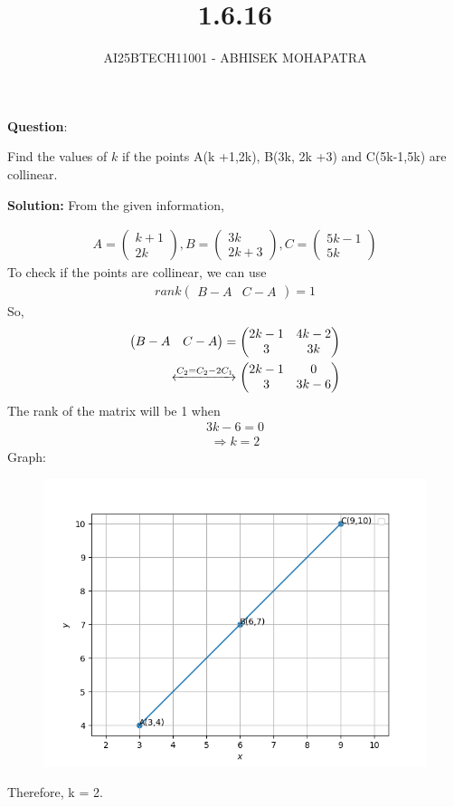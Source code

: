 \documentclass{beamer}
\title{1.6.16}
\author{AI25BTECH11001 - ABHISEK MOHAPATRA}
\theoremstyle{remark}
\newcommand{\myvec}[1]{\ensuremath{\begin{pmatrix}#1\end{pmatrix}}}
\numberwithin{equation}{section}
\begin{document}
\maketitle
		\textbf{Question}:

		\noindent Find the values of $k$ if the points A(k +1,2k), B(3k, 2k +3) and C(5k-1,5k) are collinear.

		\textbf{Solution:} From the given information,


		\begin{align}
			A = \myvec{k+1\\2k},B = \myvec{3k\\2k+3},C = \myvec{5k-1\\5k} 
		\end{align}
		To check if the points are collinear, we can use 
		\begin{align}
			rank\myvec{B-A & C-A} = 1	
		\end{align}
		So,
		\begin{align}
			\myvec{B-A & C-A} = \myvec{2k-1 & 4k-2 \\ 3 & 3k}	
			\\
			\xleftrightarrow[]{C_2 = C_2 - 2C_1} 
			\myvec{2k-1 & 0 \\ 3 & 3k-6} 
		\end{align}
		The rank of the matrix will be 1 when 
		\begin{align}
		3k-6 = 0
		\end{align}
		\begin{align}
		\Rightarrow k = 2
		\end{align}
		Graph:
\begin{figure}[H]
	\centering
	\includegraphics[scale=0.3]{img}
	\caption*{}
	\label{img}
\end{figure}


		Therefore, k = 2.
\end{document}
